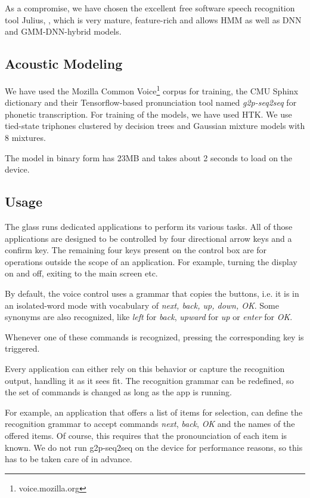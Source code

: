 \documentclass{llncs}
\begin{document}
As a compromise, we have chosen the excellent free software speech recognition
tool Julius\cite{lee2001julius}, \cite{lee2009recent}, which is very mature,
feature-rich and allows HMM as well as DNN and GMM-DNN-hybrid models.

\subsection{Acoustic Modeling}

We have used the Mozilla Common Voice\footnote{voice.mozilla.org} corpus for
training, the CMU Sphinx\cite{lamere2003cmu} dictionary and their
Tensorflow\cite{abadi2016tensorflow}-based pronunciation tool named {\em
g2p-seq2seq} for phonetic transcription. For training of the models, we have
used HTK\cite{young2002htk}. We use tied-state triphones clustered by decision
trees and Gaussian mixture models with 8 mixtures.

The model in binary form has 23MB and takes about 2 seconds to load on the
device.

\subsection{Usage}

The glass runs dedicated applications to perform its various tasks. All of those
applications are designed to be controlled by four directional arrow keys and a
confirm key. The remaining four keys present on the control box are for
operations outside the scope of an application. For example, turning the display
on and off, exiting to the main screen etc.

By default, the voice control uses a grammar that copies the buttons, i.e. it is
in an isolated-word mode with vocabulary of {\em next, back, up, down, OK}.
Some synonyms are also recognized, like {\em left} for {\em back}, {\em upward}
for {\em up} or {\em enter} for {\em OK}.

Whenever one of these commands is recognized, pressing the corresponding key
is triggered.

Every application can either rely on this behavior or capture the recognition
output, handling it as it sees fit. The recognition grammar can be redefined, so
the set of commands is changed as long as the app is running.

For example, an application that offers a list of items for selection, can
define the recognition grammar to accept commands {\em next}, {\em back}, {\em
OK} and the names of the offered items. Of course, this requires that the
pronounciation of each item is known. We do not run g2p-seq2seq on the device
for performance reasons, so this has to be taken care of in advance.
\end{document}
